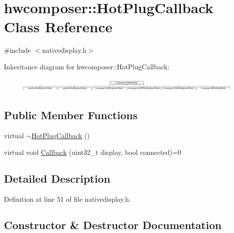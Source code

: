 \hypertarget{classhwcomposer_1_1HotPlugCallback}{}\section{hwcomposer\+:\+:Hot\+Plug\+Callback Class Reference}
\label{classhwcomposer_1_1HotPlugCallback}


{\ttfamily \#include $<$nativedisplay.\+h$>$}

Inheritance diagram for hwcomposer\+:\+:Hot\+Plug\+Callback\+:\begin{figure}[H]
\begin{center}
\leavevmode
\includegraphics[height=0.709759cm]{classhwcomposer_1_1HotPlugCallback}
\end{center}
\end{figure}
\subsection*{Public Member Functions}
\begin{DoxyCompactItemize}
\item 
virtual \mbox{\hyperlink{classhwcomposer_1_1HotPlugCallback_a66fb4d75a8df0e0ef5f1bcf0954863b4}{$\sim$\+Hot\+Plug\+Callback}} ()
\item 
virtual void \mbox{\hyperlink{classhwcomposer_1_1HotPlugCallback_a455c8913e1da9b165134a05c9cb441ba}{Callback}} (uint32\+\_\+t display, bool connected)=0
\end{DoxyCompactItemize}


\subsection{Detailed Description}


Definition at line 51 of file nativedisplay.\+h.



\subsection{Constructor \& Destructor Documentation}
\mbox{\label{classhwcomposer_1_1HotPlugCallback_a66fb4d75a8df0e0ef5f1bcf0954863b4}} 
